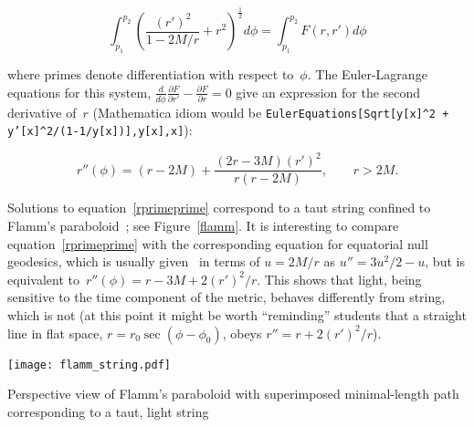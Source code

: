 \documentclass{ws-tpe}
\begin{document}

\begin{equation}
  \int_{p_1}^{p_2}\left(\frac{\left(r'\right)^2}{1-2M/r} + r^2\right)^\frac{1}{2}d\phi=
  \int_{p_1}^{p_2}F\left(r,r'\right)d\phi
\end{equation}

\noindent where primes denote differentiation with respect to~$\phi$.
The Euler-Lagrange equations for this system,
$\frac{d}{d\phi}\frac{\partial F}{\partial r'}-\frac{\partial
  F}{\partial r}=0$ give an expression for the second derivative
of~$r$ (Mathematica idiom would be {\tt EulerEquations[Sqrt[y[x]\^{}2
      + y'[x]\^{}2/(1-1/y[x])],y[x],x]}):

\begin{equation}\label{rprimeprime}
  r''\left(\phi\right) =
  (r-2M) + \frac{(2r-3M)\left(r'\right)^2}{r\left(r-2M\right)},\qquad r>2M.
\end{equation}

\noindent Solutions to equation~\ref{rprimeprime} correspond to a taut
string confined to Flamm's paraboloid~\cite{flamm1916}; see
Figure~\ref{flamm}.  It is interesting to compare
equation~\ref{rprimeprime} with the corresponding equation for
equatorial null geodesics, which is usually given~\cite{wald} in terms
of $u=2M/r$ as $u''=3u^2/2-u$, but is equivalent
to~$r''\left(\phi\right)=r-3M+2\left(r'\right)^2/r$.  This shows that
light, being sensitive to the time component of the metric, behaves
differently from string, which is not (at this point it might be worth
``reminding'' students that a straight line in flat space,
$r=r_0\sec\left(\phi-\phi_0\right)$, obeys
$r''=r+2\left(r'\right)^2/r$).

\begin{figurehere} %
\centering
\texttt{[image: flamm\_string.pdf]}
\caption{Perspective view of Flamm's paraboloid with superimposed minimal-length
  path corresponding to a taut, light string}
\label{flamm}
\end{figurehere}
\end{document}
